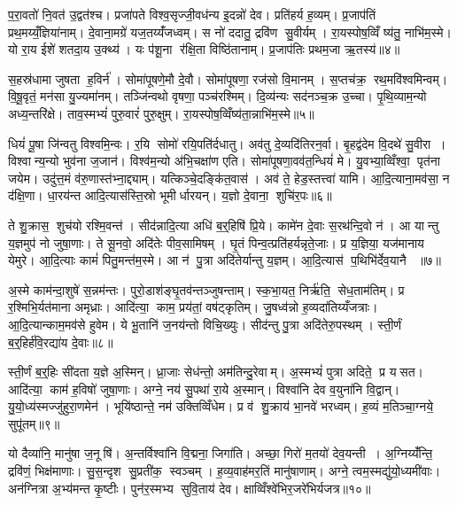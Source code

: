 प॒रा॒वतो॑ नि॒वत॑ उ॒द्वत॑श्च। प्रजा॑पते विश्व॒सृज्जी॒वध॑न्य इ॒दन्नो॑ देव। प्रति॑हर्य ह॒व्यम्। प्र॒जाप॑तिं प्रथ॒मय्यँ॒ज्ञिया॑नाम्। दे॒वाना॒मग्रे॑ यज॒तय्यँ॑जध्वम्। स नो॑ ददातु॒ द्रवि॑ण सु॒वीर्यम्। रा॒यस्पोष॒व्विँ ष्य॑तु॒ नाभि॑म॒स्मे। यो रा॒य ईशे॑ शतदा॒य उ॒क्थ्य॑। यः प॑शू॒ना र॑क्षि॒ता विष्ठि॑तानाम्। प्र॒जाप॑तिः प्रथम॒जा ऋ॒तस्य॑॥४॥

स॒हस्र॑धामा जुषता ह॒विर्न॑। सोमा॑पूषणे॒मौ दे॒वौ। सोमा॑पूषणा॒ रज॑सो वि॒मानम्। स॒प्तच॑क्र॒ रथ॒मवि॑श्वमिन्वम्। वि॒षू॒वृतं॒ मन॑सा यु॒ज्यमा॑नम्। तञ्जि॑न्वथो वृषणा॒ पञ्च॑रश्मिम्। दि॒व्य॑न्यः सद॑नञ्च॒क्र उ॒च्चा। पृ॒थि॒व्याम॒न्यो अध्य॒न्तरि॑क्षे। ताव॒स्मभ्यं॑ पुरु॒वारं॑ पुरु॒क्षुम्। रा॒यस्पोष॒व्विँष्य॑ता॒न्नाभि॑म॒स्मे॥५॥

धियं॑ पू॒षा जि॑न्वतु विश्वमि॒न्वः। र॒यि सोमो॑ रयि॒पति॑र्दधातु। अव॑तु दे॒व्यदि॑तिरन॒र्वा। बृ॒हद्व॑देम वि॒दथे॑ सु॒वीरा। विश्वान्य॒न्यो भुव॑ना ज॒जान॑। विश्व॑म॒न्यो अ॑भि॒चक्षा॑ण एति। सोमा॑पूषणा॒वव॑त॒न्धियं॑ मे। यु॒वभ्या॒व्विँश्वा॒ पृत॑ना जयेम। उदु॑त्त॒मं व॑रु॒णास्त॑भ्ना॒द्द्याम्। यत्किञ्चे॒दङ्कि॑त॒वास॑। अव॑ ते॒ हेड॒स्तत्त्वा॑ यामि। आ॒दि॒त्याना॒मव॑सा॒ न द॑क्षि॒णा। धा॒रय॑न्त आदि॒त्यास॑स्ति॒स्रो भूमीर्धारयन्। य॒ज्ञो दे॒वाना॒ शुचि॑र॒पः॥६॥\anuvakamend[म॒नी॒षाऽस्तु॑ च॒र्तस्या॒स्मे कि॑त॒वास॑श्च॒त्वारि॑ च]

ते शु॒क्रास॒ शुच॑यो रश्मि॒वन्त॑। सीद॑न्नादि॒त्या अधि॑ ब॒र्॒हिषि॑ प्रि॒ये। कामे॑न दे॒वाः स॒रथ॑न्दि॒वो न॑। आ यान्तु य॒ज्ञमुप॑ नो जुषा॒णाः। ते सू॒नवो॒ अदि॑तेः पीव॒सामिषम्। घृ॒तं पिन्व॒त्प्रति॑हर्यन्नृते॒जाः। प्र य॒ज्ञिया॒ यज॑मानाय येमुरे। आ॒दि॒त्याः कामं॑ पितु॒मन्त॑म॒स्मे। आ न॑ पु॒त्रा अदि॑तेर्यान्तु य॒ज्ञम्। आ॒दि॒त्यास॑ प॒थिभि॑र्देव॒यानै ॥७॥

अ॒स्मे काम॑न्दा॒शुषे॑ स॒न्नम॑न्तः। पुरो॒डाश॑ङ्घृ॒तव॑न्तञ्जुषन्ताम्। स्क॒भा॒यत॒ निर्\mbox{}ऋ॑ति॒ सेध॒ताम॑तिम्। प्र र॒श्मिभि॒र्यत॑माना अमृध्राः। आदि॑त्या॒ काम॒ प्रय॑तां॒ वष॑ट्कृतिम्। जु॒षध्व॑न्नो ह॒व्यदा॑तिय्यँजत्राः। आ॒दि॒त्यान्काम॒मव॑से हुवेम। ये भू॒तानि॑ ज॒नय॑न्तो विचि॒ख्युः। सीद॑न्तु पु॒त्रा अदि॑तेरु॒पस्थम्। स्ती॒र्णं ब॒र्॒हिर्\mbox{}ह॑वि॒रद्या॑य दे॒वाः॥८॥

स्ती॒र्णं ब॒र्॒हिः सी॑दता य॒ज्ञे अ॒स्मिन्। ध्रा॒जाः सेध॑न्तो॒ अम॑तिन्दु॒रेवाम्। अ॒स्मभ्यं॑ पुत्रा अदिते॒ प्र यसत। आदि॑त्या॒ काम॑ ह॒विषो॑ जुषा॒णाः। अग्ने॒ नय॑ सु॒पथा॑ रा॒ये अ॒स्मान्। विश्वा॑नि देव व॒युना॑नि वि॒द्वान्। यु॒यो॒ध्य॑स्मज्जु॑हुरा॒णमेन॑। भूयि॑ष्ठान्ते॒ नम॑ उक्तिव्विँधेम। प्र व॑ शु॒क्राय॑ भा॒नवे॑ भरध्वम्। ह॒व्यं म॒तिञ्चा॒ग्नये॒ सुपू॑तम्॥९॥

यो दैव्या॑नि॒ मानु॑षा ज॒नूषि॑। अ॒न्तर्विश्वा॑नि वि॒द्मना॒ जिगा॑ति। अच्छा॒ गिरो॑ म॒तयो॑ देव॒यन्ती। अ॒ग्निय्यँ॑न्ति॒ द्रवि॑णं॒ भिक्ष॑माणाः। सु॒स॒न्दृश सु॒प्रती॑क॒ स्वञ्चम्। ह॒व्य॒वाह॑मर॒तिं मानु॑षाणाम्। अग्ने॒ त्वम॒स्मद्यु॑यो॒ध्यमी॑वाः। अन॑ग्नित्रा अ॒भ्य॑मन्त कृ॒ष्टीः। पुन॑र॒स्मभ्य सुवि॒ताय॑ देव। क्षाव्विँश्वे॑भिर॒जरे॑भिर्यजत्र॥१०॥

